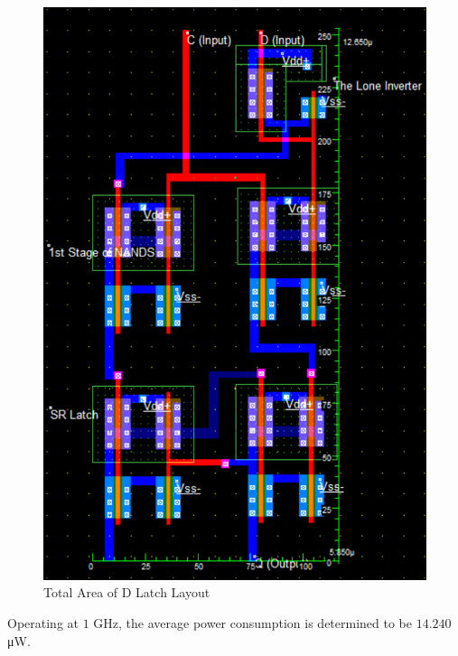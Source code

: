 \begin{figure}[h!]
	\centering
	\includegraphics[scale=0.70]{../images/dlatch_layout_area.PNG}
	\caption{Total Area of D Latch Layout}
	\label{fig:dlatch_area}
\end{figure}

\FloatBarrier

Operating at $1$ \si{\giga\hertz}, the average power consumption is determined to be $14.240$ \si{\micro\watt}.
